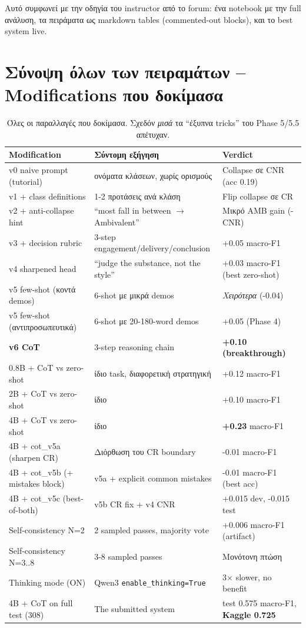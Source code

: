 \documentclass[12pt]{fphw}
\begin{document}
Αυτό συμφωνεί με την οδηγία του instructor από το forum: ένα notebook με την full ανάλυση, τα πειράματα ως markdown tables (commented-out blocks), και το best system live.

\section{Σύνοψη όλων των πειραμάτων -- Modifications που δοκίμασα}

\begin{table}[H]
\centering
\small
\begin{tabularx}{\textwidth}{lXl}
\toprule
Modification & Σύντομη εξήγηση & Verdict \\
\midrule
v0 naive prompt (tutorial) & ονόματα κλάσεων, χωρίς ορισμούς & Collapse σε CNR (acc 0.19) \\
v1 + class definitions & 1-2 προτάσεις ανά κλάση & Flip collapse σε CR \\
v2 + anti-collapse hint & ``most fall in between $\to$ Ambivalent'' & Mικρό AMB gain (-CNR) \\
v3 + decision rubric & 3-step engagement/delivery/conclusion & +0.05 macro-F1 \\
v4 sharpened head & ``judge the substance, not the style'' & +0.03 macro-F1 (best zero-shot) \\
v5 few-shot (κοντά demos) & 6-shot με μικρά demos & \emph{Χειρότερα} (-0.04) \\
v5 few-shot (αντιπροσωπευτικά) & 6-shot με 20-180-word demos & +0.05 (Phase 4) \\
\textbf{v6 CoT} & 3-step reasoning chain & \textbf{+0.10 (breakthrough)} \\
\midrule
0.8B + CoT vs zero-shot & ίδιο task, διαφορετική στρατηγική & +0.12 macro-F1 \\
2B + CoT vs zero-shot & ίδιο & +0.10 macro-F1 \\
4B + CoT vs zero-shot & ίδιο & \textbf{+0.23} macro-F1 \\
\midrule
4B + cot\_v5a (sharpen CR) & Διόρθωση του CR boundary & -0.01 macro-F1 \\
4B + cot\_v5b (+ mistakes block) & v5a + explicit common mistakes & -0.01 macro-F1 (best acc) \\
4B + cot\_v5c (best-of-both) & v5b CR fix + v4 CNR & +0.015 dev, -0.015 test \\
\midrule
Self-consistency N=2 & 2 sampled passes, majority vote & +0.006 macro-F1 (artifact) \\
Self-consistency N=3..8 & 3-8 sampled passes & Μονότονη πτώση \\
Thinking mode (ON) & Qwen3 \texttt{enable\_thinking=True} & 3× slower, no benefit \\
\midrule
4B + CoT on full test (308) & The submitted system & test 0.575 macro-F1, \textbf{Kaggle 0.725} \\
\bottomrule
\end{tabularx}
\caption{Όλες οι παραλλαγές που δοκίμασα. Σχεδόν \emph{μισά} τα ``έξυπνα tricks'' του Phase 5/5.5 απέτυχαν.}
\label{tab:modifications}
\end{table}
\end{document}
